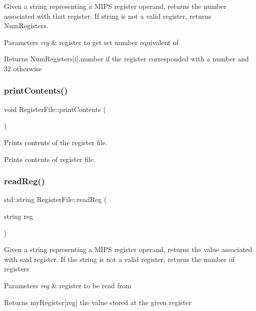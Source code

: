 Given a string representing a M\+I\+PS register operand, returns the number associated with that register. If string is not a valid register, returns Num\+Registers. 
\begin{DoxyParams}{Parameters}
{\em reg} & register to get set number equivalent of \\
\hline
\end{DoxyParams}
\begin{DoxyReturn}{Returns}
Num\+Registers\mbox{[}i\mbox{]}.number if the register corresponded with a number and 32 otherwise 
\end{DoxyReturn}
\mbox{\label{class_register_file_ac72ef70e7bdee7b5ac7afbfdcd6d8ab1}} 
\subsubsection{\texorpdfstring{print\+Contents()}{printContents()}}
{\footnotesize\ttfamily void Register\+File\+::print\+Contents (\begin{DoxyParamCaption}{ }\end{DoxyParamCaption})}



Prints contents of the register file. 

Prints contents of register file. \mbox{\label{class_register_file_a5554dd7d1b78c4a59b23036e9aa66136}} 
\subsubsection{\texorpdfstring{read\+Reg()}{readReg()}}
{\footnotesize\ttfamily std\+::string Register\+File\+::read\+Reg (\begin{DoxyParamCaption}\item[{string}]{reg }\end{DoxyParamCaption})}

Given a string representing a M\+I\+PS register operand, returns the value associated with said register. If the string is not a valid register, returns the number of registers 
\begin{DoxyParams}{Parameters}
{\em reg} & register to be read from \\
\hline
\end{DoxyParams}
\begin{DoxyReturn}{Returns}
my\+Register\mbox{[}reg\mbox{]} the value stored at the given register 
\end{DoxyReturn}
\mbox{\label{class_register_file_a4e4802bee78d7c7173c829764babca9c}} 

